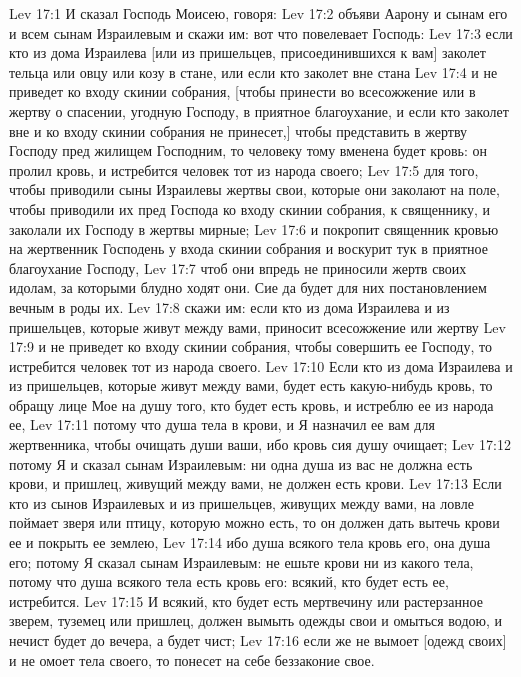 \vs Lev 17:1 И сказал Господь Моисею, говоря:
\vs Lev 17:2 объяви Аарону и сынам его и всем сынам Израилевым и скажи им: вот что повелевает Господь:
\vs Lev 17:3 если кто из дома Израилева [или из пришельцев, присоединившихся к вам] заколет тельца или овцу или козу в стане, или если кто заколет вне стана
\vs Lev 17:4 и не приведет ко входу скинии собрания, [чтобы принести во всесожжение или в жертву о спасении, угодную Господу, в приятное благоухание, и если кто заколет вне  и ко входу скинии собрания не принесет,] чтобы представить в жертву Господу пред жилищем Господним, то человеку тому вменена будет кровь: он пролил кровь, и истребится человек тот из народа своего;
\vs Lev 17:5  для того, чтобы приводили сыны Израилевы жертвы свои, которые они заколают на поле, чтобы приводили их пред Господа ко входу скинии собрания, к священнику, и заколали их Господу в жертвы мирные;
\vs Lev 17:6 и покропит священник кровью на жертвенник Господень у входа скинии собрания и воскурит тук в приятное благоухание Господу,
\vs Lev 17:7 чтоб они впредь не приносили жертв своих идолам, за которыми блудно ходят они. Сие да будет для них постановлением вечным в роды их.
\rsbpar\vs Lev 17:8  скажи им: если кто из дома Израилева и из пришельцев, которые живут между вами, приносит всесожжение или жертву
\vs Lev 17:9 и не приведет ко входу скинии собрания, чтобы совершить ее Господу, то истребится человек тот из народа своего.
\vs Lev 17:10 Если кто из дома Израилева и из пришельцев, которые живут между вами, будет есть какую-нибудь кровь, то обращу лице Мое на душу того, кто будет есть кровь, и истреблю ее из народа ее,
\vs Lev 17:11 потому что душа тела в крови, и Я назначил ее вам для жертвенника, чтобы очищать души ваши, ибо кровь сия душу очищает;
\vs Lev 17:12 потому Я и сказал сынам Израилевым: ни одна душа из вас не должна есть крови, и пришлец, живущий между вами, не должен есть крови.
\vs Lev 17:13 Если кто из сынов Израилевых и из пришельцев, живущих между вами, на ловле поймает зверя или птицу, которую можно есть, то он должен дать вытечь крови ее и покрыть ее землею,
\vs Lev 17:14 ибо душа всякого тела  кровь его, она душа его; потому Я сказал сынам Израилевым: не ешьте крови ни из какого тела, потому что душа всякого тела есть кровь его: всякий, кто будет есть ее, истребится.
\vs Lev 17:15 И всякий, кто будет есть мертвечину или растерзанное зверем, туземец или пришлец, должен вымыть одежды свои и омыться водою, и нечист будет до вечера, а  будет чист;
\vs Lev 17:16 если же не вымоет [одежд своих] и не омоет тела своего, то понесет на себе беззаконие свое.
